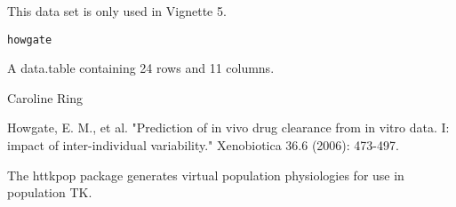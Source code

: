 \documentclass[a4paper]{book}
\begin{document}
%
\begin{Description}\relax
This data set is only used in Vignette 5.
\end{Description}
%
\begin{Usage}
\begin{verbatim}
howgate
\end{verbatim}
\end{Usage}
%
\begin{Format}
A data.table containing 24 rows and 11 columns.
\end{Format}
%
\begin{Author}\relax
Caroline Ring
\end{Author}
%
\begin{References}\relax
Howgate, E. M., et al. "Prediction of in vivo drug clearance from in vitro
data. I: impact of inter-individual variability." Xenobiotica 36.6 (2006):
473-497.
\end{References}
%
\begin{Description}\relax
The httkpop package generates virtual population physiologies for use in 
population TK.
\end{Description}
%
\end{document}
